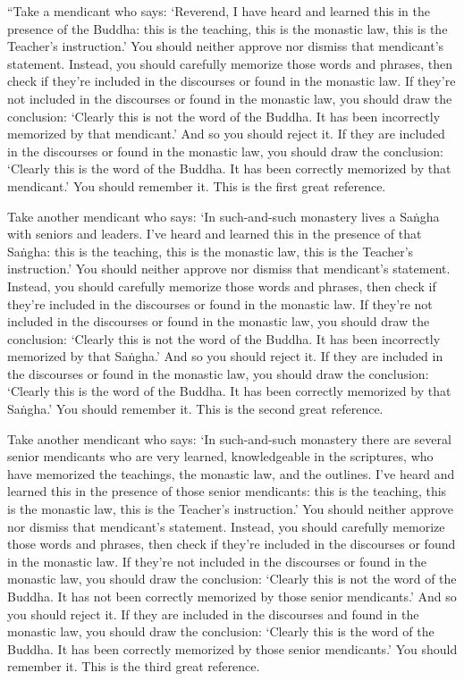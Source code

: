 \documentclass[12pt,openany]{book}%
\begin{document}
“Take a mendicant who says: ‘Reverend, I have heard and learned this in the presence of the Buddha: this is the teaching, this is the monastic law, this is the Teacher’s instruction.’ You should neither approve nor dismiss that mendicant’s statement. Instead, you should carefully memorize those words and phrases, then check if they’re included in the discourses or found in the monastic law. If they’re not included in the discourses or found in the monastic law, you should draw the conclusion: ‘Clearly this is not the word of the Buddha. It has been incorrectly memorized by that mendicant.’ And so you should reject it. If they are included in the discourses or found in the monastic law, you should draw the conclusion: ‘Clearly this is the word of the Buddha. It has been correctly memorized by that mendicant.’ You should remember it. This is the first great reference. 

Take another mendicant who says: ‘In such-and-such monastery lives a \textsanskrit{Saṅgha} with seniors and leaders. I’ve heard and learned this in the presence of that \textsanskrit{Saṅgha}: this is the teaching, this is the monastic law, this is the Teacher’s instruction.’ You should neither approve nor dismiss that mendicant’s statement. Instead, you should carefully memorize those words and phrases, then check if they’re included in the discourses or found in the monastic law. If they’re not included in the discourses or found in the monastic law, you should draw the conclusion: ‘Clearly this is not the word of the Buddha. It has been incorrectly memorized by that \textsanskrit{Saṅgha}.’ And so you should reject it. If they are included in the discourses or found in the monastic law, you should draw the conclusion: ‘Clearly this is the word of the Buddha. It has been correctly memorized by that \textsanskrit{Saṅgha}.’ You should remember it. This is the second great reference. 

Take another mendicant who says: ‘In such-and-such monastery there are several senior mendicants who are very learned, knowledgeable in the scriptures, who have memorized the teachings, the monastic law, and the outlines. I’ve heard and learned this in the presence of those senior mendicants: this is the teaching, this is the monastic law, this is the Teacher’s instruction.’ You should neither approve nor dismiss that mendicant’s statement. Instead, you should carefully memorize those words and phrases, then check if they’re included in the discourses or found in the monastic law. If they’re not included in the discourses or found in the monastic law, you should draw the conclusion: ‘Clearly this is not the word of the Buddha. It has not been correctly memorized by those senior mendicants.’ And so you should reject it. If they are included in the discourses and found in the monastic law, you should draw the conclusion: ‘Clearly this is the word of the Buddha. It has been correctly memorized by those senior mendicants.’ You should remember it. This is the third great reference. 
\end{document}
